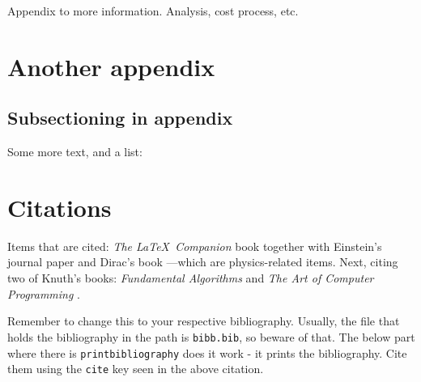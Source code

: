 \documentclass[10pt,a4paper]{article}
\begin{document}
Appendix to more information. Analysis, cost process, etc. 

\section{Another appendix}

\subsection*{Subsectioning in appendix}

Some more text, and a list:

\blindenumerate



\section{Citations}
Items that are cited: \textit{The \LaTeX\ Companion} book \cite{latexcompanion} together with Einstein's journal paper \cite{einstein} and Dirac's book \cite{dirac}---which are physics-related items. Next, citing two of Knuth's books: \textit{Fundamental Algorithms} \cite{knuth-fa} and \textit{The Art of Computer Programming} \cite{knuthwebsite}.


Remember to change this to your respective bibliography. Usually, the file that holds the bibliography in the path is \texttt{bibb.bib}, so beware of that. The below part where there is \texttt{printbibliography} does it work - it prints the bibliography. Cite them using the \texttt{cite} key seen in the above citation. 

\medskip

\printbibliography %
\end{document}
